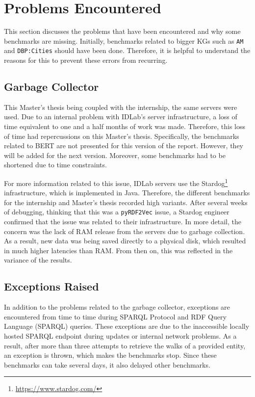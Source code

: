 \section{Problems Encountered}
\label{sec:objectives:problems}

This section discusses the problems that have been encountered and why some
benchmarks are missing. Initially, benchmarks related to bigger KGs such as
\texttt{AM} and \texttt{DBP:Cities} should have been done. Therefore, it is
helpful to understand the reasons for this to prevent these errors from
recurring.

\subsection{Garbage Collector}
\label{subsec:garbage:collector}

This Master's thesis being coupled with the internship, the same servers were
used. Due to an internal problem with IDLab's server infrastructure, a loss of
time equivalent to one and a half months of work was made. Therefore, this loss
of time had repercussions on this Master's thesis. Specifically, the benchmarks
related to BERT are not presented for this version of the report. However, they
will be added for the next version. Moreover, some benchmarks had to be
shortened due to time constraints.

For more information related to this issue, IDLab servers use the
Stardog\footnote{\url{https://www.stardog.com/}} infrastructure, which is
implemented in Java. Therefore, the different benchmarks for the internship and
Master's thesis recorded high variants. After several weeks of debugging,
thinking that this was a \texttt{pyRDF2Vec} issue, a Stardog engineer confirmed
that the issue was related to their infrastructure. In more detail, the concern
was the lack of RAM release from the servers due to garbage collection. As a
result, new data was being saved directly to a physical disk, which resulted in
much higher latencies than RAM. From then on, this was reflected in the variance
of the results.

\subsection{Exceptions Raised}
\label{subsec:exception:raised}

In addition to the problems related to the garbage collector, exceptions are
encountered from time to time during SPARQL Protocol and RDF Query Language
(SPARQL) queries. These exceptions are due to the inaccessible locally hosted
SPARQL endpoint during updates or internal network problems. As a result, after
more than three attempts to retrieve the walks of a provided entity, an
exception is thrown, which makes the benchmarks stop. Since these benchmarks can
take several days, it also delayed other benchmarks.


